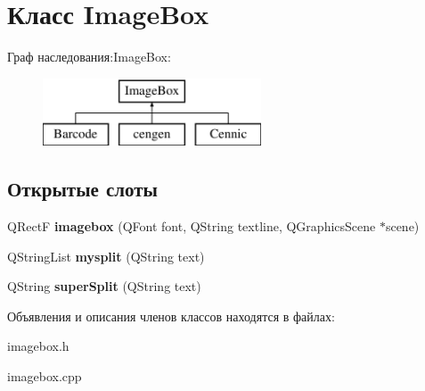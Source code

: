 \hypertarget{class_image_box}{\section{Класс \-Image\-Box}
\label{class_image_box}
}
Граф наследования\-:\-Image\-Box\-:\begin{figure}[H]
\begin{center}
\leavevmode
\includegraphics[height=2.000000cm]{class_image_box}
\end{center}
\end{figure}
\subsection*{Открытые слоты}
\begin{DoxyCompactItemize}
\item 
\hypertarget{class_image_box_a2fc7d31293be479a6e64e66353df977b}{\-Q\-Rect\-F {\bfseries imagebox} (\-Q\-Font font, \-Q\-String textline, \-Q\-Graphics\-Scene $\ast$scene)}\label{class_image_box_a2fc7d31293be479a6e64e66353df977b}

\item 
\hypertarget{class_image_box_a4e3ed1b4969354e8039d2c635f553bca}{\-Q\-String\-List {\bfseries mysplit} (\-Q\-String text)}\label{class_image_box_a4e3ed1b4969354e8039d2c635f553bca}

\item 
\hypertarget{class_image_box_a8155dd2b7207c1b58843e9a3b01215a5}{\-Q\-String {\bfseries super\-Split} (\-Q\-String text)}\label{class_image_box_a8155dd2b7207c1b58843e9a3b01215a5}

\end{DoxyCompactItemize}


Объявления и описания членов классов находятся в файлах\-:\begin{DoxyCompactItemize}
\item 
imagebox.\-h\item 
imagebox.\-cpp\end{DoxyCompactItemize}
